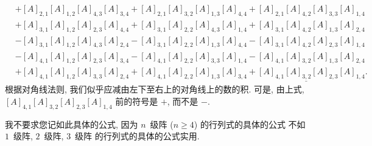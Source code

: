 \documentclass[../libro.tex]{subfiles}
\begin{document}
\begin{example}
\begin{align*}
        &
        + [A]_{2,1} [A]_{1,2} [A]_{4,3} [A]_{3,4}
        + [A]_{2,1} [A]_{3,2} [A]_{1,3} [A]_{4,4}
        + [A]_{2,1} [A]_{4,2} [A]_{3,3} [A]_{1,4}
        \\
        &
        + [A]_{3,1} [A]_{1,2} [A]_{2,3} [A]_{4,4}
        + [A]_{3,1} [A]_{2,2} [A]_{4,3} [A]_{1,4}
        + [A]_{3,1} [A]_{4,2} [A]_{1,3} [A]_{2,4}
        \\
        &
        - [A]_{3,1} [A]_{1,2} [A]_{4,3} [A]_{2,4}
        - [A]_{3,1} [A]_{2,2} [A]_{1,3} [A]_{4,4}
        - [A]_{3,1} [A]_{4,2} [A]_{2,3} [A]_{1,4}
        \\
        &
        - [A]_{4,1} [A]_{1,2} [A]_{2,3} [A]_{3,4}
        - [A]_{4,1} [A]_{2,2} [A]_{3,3} [A]_{1,4}
        - [A]_{4,1} [A]_{3,2} [A]_{1,3} [A]_{2,4}
        \\
        &
        + [A]_{4,1} [A]_{1,2} [A]_{3,3} [A]_{2,4}
        + [A]_{4,1} [A]_{2,2} [A]_{1,3} [A]_{3,4}
        \underline{{}
        + [A]_{4,1} [A]_{3,2} [A]_{2,3} [A]_{1,4}}.
    \end{align*}
    根据对角线法则,
    我们似乎应减由左下至右上的对角线上的数的积.
    可是, 由上式,
    \([A]_{4,1} [A]_{3,2} [A]_{2,3} [A]_{1,4}\)
    前的符号是 \(+\),
    而不是 \(-\).
    \begin{figure}[h!]
        \centering
    \end{figure}

    我不要求您记如此具体的公式,
    因为 \(n\)~级阵 (\(n \geq 4\)) 的行列式的具体的公式%
    不如 \(1\)~级阵, \(2\)~级阵, \(3\)~级阵%
    的行列式的具体的公式实用.
\end{example}
\end{document}
